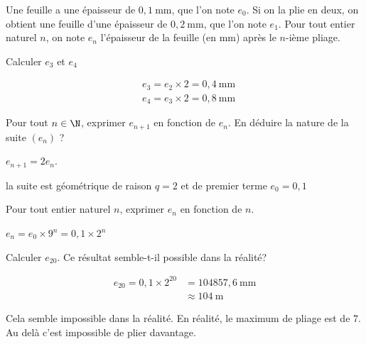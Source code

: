 \documentclass[12pt,a4paper]{article}  %
\begin{document}

Une feuille a une épaisseur de $0,1 \mathrm{~mm}$, que l'on note $e_0$. Si on la plie en deux, on obtient une feuille d'une épaisseur de $0,2 \mathrm{~mm}$, que l'on note $e_1$. Pour tout entier naturel $n$, on note $e_n$ l'épaisseur de la feuille (en mm) après le $n$-ième pliage.
\begin{enumMet}
	\item Calculer $e_3$ et $e_4$
	\begin{corrBox}
		$$
		\begin{aligned}
			& e_3=e_2 \times 2=0,4 \mathrm{~mm} \\
			& e_4=e_3 \times 2=0,8 \mathrm{~mm}
		\end{aligned}
		$$		
	\end{corrBox}
	\item Pour tout $n \in \N$, exprimer $e_{n+1}$ en fonction de $e_n$. En déduire la nature de la suite $\left(e_n\right)$ ?
	\begin{corrBox}
		$e_{n+1}=2 e_n$. 
		
		la suite est géométrique de raison $q=2$ et de premier terme $e_0=0,1$		
	\end{corrBox}
	\item Pour tout entier naturel $n$, exprimer $e_n$ en fonction de $n$.
	\begin{corrBox}
		$e_n=e_0 \times 9^n=0,1 \times 2^n$		
	\end{corrBox}
	\item Calculer $e_{20}$. Ce résultat semble-t-il possible dans la réalité?
	\begin{corrBox}
		$$\begin{aligned}
			e_{20}=0,1 \times 2^{20} & =104857,6 \mathrm{~mm} \\
			& \approx 104 \mathrm{~m}
		\end{aligned}$$
		
		Cela semble impossible dans la réalité. En réalité, le maximum de pliage est de 7. Au delà c'est impossible de plier davantage.		
	\end{corrBox}
\end{enumMet}
\end{document}
